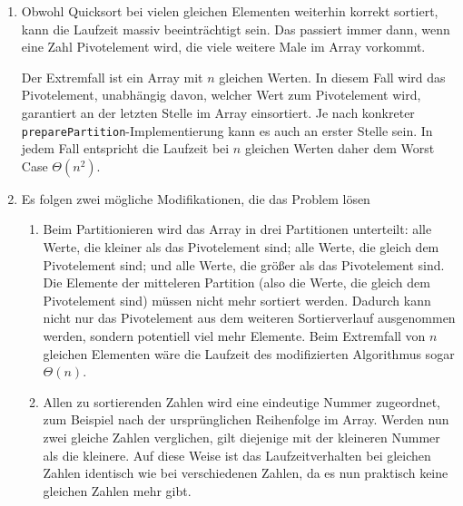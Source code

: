 \documentclass[11pt,a4paper]{article}
\begin{document}
\begin{loesung}
    \begin{enumerate}
        \item Obwohl Quicksort bei vielen gleichen Elementen weiterhin korrekt sortiert, kann die Laufzeit massiv beeinträchtigt sein.
        Das passiert immer dann, wenn eine Zahl Pivotelement wird, die viele weitere Male im Array vorkommt.
        
        Der Extremfall ist ein Array mit $n$ gleichen Werten.
        In diesem Fall wird das Pivotelement, unabhängig davon, welcher Wert zum Pivotelement wird, garantiert an der letzten Stelle im Array einsortiert.
        Je nach konkreter \texttt{preparePartition}-Implementierung kann es auch an erster Stelle sein.
        In jedem Fall entspricht die Laufzeit bei $n$ gleichen Werten daher dem Worst Case $\Theta(n^2)$.

        \item Es folgen zwei mögliche Modifikationen, die das Problem lösen
        \begin{enumerate}[label=\roman*)]
            \item Beim Partitionieren wird das Array in drei Partitionen unterteilt: alle Werte, die kleiner als das Pivotelement sind; alle Werte, die gleich dem Pivotelement sind; und alle Werte, die größer als das Pivotelement sind.
            Die Elemente der mitteleren Partition (also die Werte, die gleich dem Pivotelement sind) müssen nicht mehr sortiert werden.
            Dadurch kann nicht nur das Pivotelement aus dem weiteren Sortierverlauf ausgenommen werden, sondern potentiell viel mehr Elemente.
            Beim Extremfall von $n$ gleichen Elementen wäre die Laufzeit des modifizierten Algorithmus sogar $\Theta(n)$.

            \item Allen zu sortierenden Zahlen wird eine eindeutige Nummer zugeordnet, zum Beispiel nach der ursprünglichen Reihenfolge im Array.
            Werden nun zwei gleiche Zahlen verglichen, gilt diejenige mit der kleineren Nummer als die kleinere.
            Auf diese Weise ist das Laufzeitverhalten bei gleichen Zahlen identisch wie bei verschiedenen Zahlen, da es nun praktisch keine gleichen Zahlen mehr gibt.

        \end{enumerate}


\end{enumerate}
\end{loesung}
\end{document}
